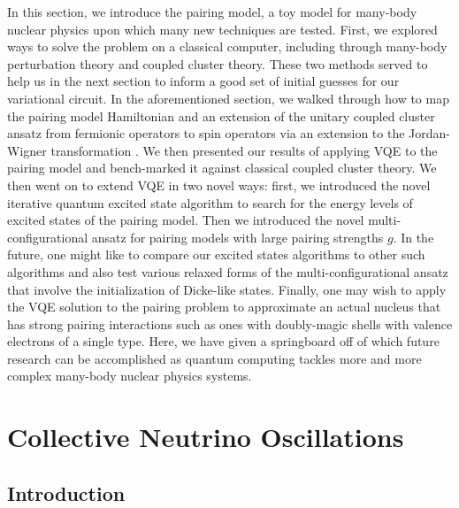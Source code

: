 \documentclass[Dual]{msu-thesis}
\begin{document}
In this section, we introduce the pairing model, a toy model for many-body nuclear physics upon which many new techniques are tested. First, we explored ways to solve the problem on a classical computer, including through many-body perturbation theory and coupled cluster theory. These two methods served to help us in the next section to inform a good set of initial guesses for our variational circuit. In the aforementioned section, we walked through how to map the pairing model Hamiltonian and an extension of the unitary coupled cluster ansatz from fermionic operators to spin operators via an extension to the Jordan-Wigner transformation . We then presented our results of applying VQE to the pairing model and bench-marked it against classical coupled cluster theory. We then went on to extend VQE in two novel ways: first, we introduced the novel iterative quantum excited state algorithm to search for the energy levels of excited states of the pairing model. Then we introduced the novel multi-configurational ansatz for pairing models with large pairing strengths $g$. In the future, one might like to compare our excited states algorithms to other such algorithms and also test various relaxed forms of the multi-configurational ansatz that involve the initialization of Dicke-like states. Finally, one may wish to apply the VQE solution to the pairing problem to approximate an actual nucleus that has strong pairing interactions such as ones with doubly-magic shells with valence electrons of a single type. Here, we have given a springboard off of which future research can be accomplished as quantum computing tackles more and more complex many-body nuclear physics systems.

\chapter{Collective Neutrino Oscillations}

\nocite{ref:cno}

\section{Introduction}
\end{document}
